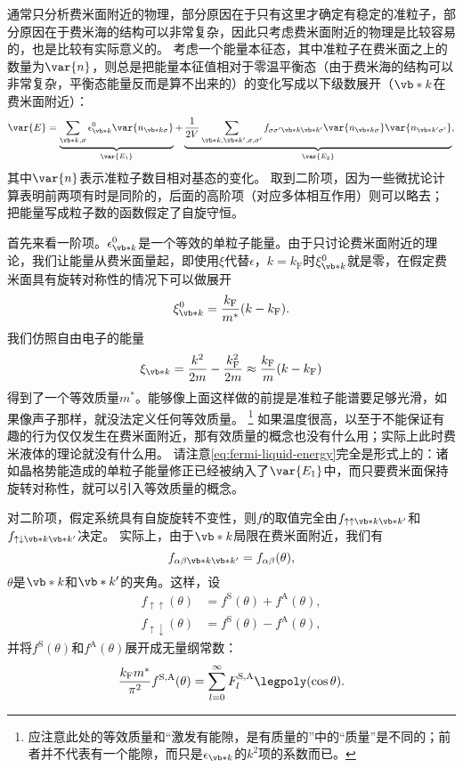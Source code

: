 通常只分析费米面附近的物理，部分原因在于只有这里才确定有稳定的准粒子，部分原因在于费米海的结构可以非常复杂，因此只考虑费米面附近的物理是比较容易的，也是比较有实际意义的。
考虑一个能量本征态，其中准粒子在费米面之上的数量为$\var{n}$，则总是把能量本征值相对于零温平衡态（由于费米海的结构可以非常复杂，平衡态能量反而是算不出来的）的变化写成以下级数展开（$\vb*{k}$在费米面附近）：
\begin{equation}
    \var{E} = \underbrace{\sum_{\vb*{k}, \sigma} \epsilon^0_{\vb*{k}} \var{n_{\vb*{k} \sigma}}}_{\var{E_1}} + \underbrace{\frac{1}{2V} \sum_{\vb*{k}, \vb*{k}', \sigma, \sigma'} f_{\sigma \sigma' \vb*{k} \vb*{k}'} \var{n_{\vb*{k} \sigma}} \var{n_{\vb*{k}' \sigma'}}}_{\var{E_2}},
    \label{eq:fermi-liquid-energy}
\end{equation}
其中$\var{n}$表示准粒子数目相对基态的变化。
取到二阶项，因为一些微扰论计算表明前两项有时是同阶的，后面的高阶项（对应多体相互作用）则可以略去；
把能量写成粒子数的函数假定了自旋守恒。

首先来看一阶项。$\epsilon^0_{\vb*{k}}$是一个等效的单粒子能量。由于只讨论费米面附近的理论，我们让能量从费米面量起，即使用$\xi$代替$\epsilon$，$k=k_\text{F}$时$\xi^0_{\vb*{k}}$就是零，在假定费米面具有旋转对称性的情况下可以做展开
\[
    \xi^0_{\vb*{k}} = \frac{k_\text{F}}{m^*} (k - k_\text{F}).
\]
我们仿照自由电子的能量
\[
    \xi_{\vb*{k}} = \frac{k^2}{2m} - \frac{k_\text{F}^2}{2m} \approx \frac{k_\text{F}}{m} (k - k_\text{F})
\]
得到了一个等效质量$m^*$。能够像上面这样做的前提是准粒子能谱要足够光滑，如果像声子那样，就没法定义任何等效质量。%
\footnote{应注意此处的等效质量和“激发有能隙，是有质量的”中的“质量”是不同的；前者并不代表有一个能隙，而只是$\epsilon_{\vb*{k}}$的$k^2$项的系数而已。}%
如果温度很高，以至于不能保证有趣的行为仅仅发生在费米面附近，那有效质量的概念也没有什么用；实际上此时费米液体的理论就没有什么用。
请注意\eqref{eq:fermi-liquid-energy}完全是形式上的：诸如晶格势能造成的单粒子能量修正已经被纳入了$\var{E_1}$中，而只要费米面保持旋转对称性，就可以引入等效质量的概念。

对二阶项，假定系统具有自旋旋转不变性，则$f$的取值完全由$f_{\uparrow \uparrow \vb*{k} \vb*{k}'}$和$f_{\uparrow \downarrow \vb*{k} \vb*{k}'}$决定。
实际上，由于$\vb*{k}$局限在费米面附近，我们有
\[
    f_{\alpha \beta \vb*{k} \vb*{k}'} = f_{\alpha \beta}(\theta),
\]
$\theta$是$\vb*{k}$和$\vb*{k}'$的夹角。这样，设
\begin{equation}
    \begin{aligned}
        f_{\uparrow \uparrow}(\theta) &= f^\text{S}(\theta) + f^\text{A}(\theta), \\
        f_{\uparrow \downarrow}(\theta) &= f^\text{S}(\theta) - f^\text{A}(\theta),
    \end{aligned}
\end{equation}
并将$f^\text{S}(\theta)$和$f^\text{A}(\theta)$展开成无量纲常数：
\begin{equation}
    \frac{k_\text{F} m^*}{\pi^2} f^\text{S,A}(\theta) = \sum_{l=0}^\infty F_l^\text{S,A} \legpoly (\cos \theta).
\end{equation}


